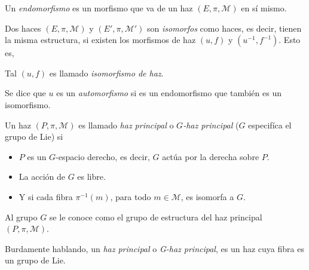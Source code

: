 \begin{mydef}[Endomorfismo]
Un \emph{endomorfismo} es un morfismo que va de un haz $(E, \pi, \mathcal{M})$ en s\'{i} mismo.
\end{mydef}

\begin{mydef}[Isomorfismo]
Dos haces $(E, \pi, \mathcal{M})$ y $(E', \pi, \mathcal{M}')$ son \emph{isomorfos} como haces, es decir, tienen la misma estructura, si existen los morfismos de haz $(u, f)$ y $(u^{-1}, f^{-1})$. Esto es,
%
\begin{center}
\end{center}
%
Tal $(u, f)$ es llamado \emph{isomorfismo de haz}.
\end{mydef}

\begin{mydef}[Automorfismo]
Se dice que $u$ es un \emph{automorfismo} si es un endomorfismo que tambi\'{e}n es un isomorfismo.
\end{mydef}

\begin{mydef}
Un haz $(P, \pi, \mathcal{M})$ es llamado \emph{haz principal} o \emph{$G$-haz principal} ($G$ especif\'{i}ca el grupo de Lie) si
\begin{itemize}
\item{$P$ es un $G$-espacio derecho, es decir, $G$ act\'{u}a por la derecha sobre $P$.}
\item{La acci\'{o}n de $G$ es libre.}
\item{Y si cada fibra $\pi^{-1}(m)$, para todo $m \in \mathcal{M}$, es isomorfa a $G$.}
\end{itemize}
Al grupo $G$ se le conoce como el grupo de estructura del haz principal $(P, \pi, \mathcal{M})$.
\end{mydef}

Burdamente hablando, un \emph{haz principal} o \emph{G-haz principal}, es un haz cuya fibra es un grupo de Lie.